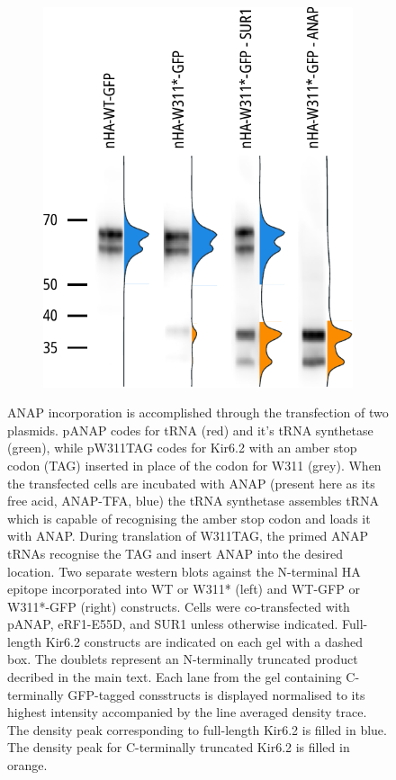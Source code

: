 \begin{figure}[h]
\begin{subfigure}[t]{0.45\textwidth}
		\includegraphics[width=\textwidth]{western_2.pdf}
	\end{subfigure}
	\caption[ANAP incorporation]{
	 ANAP incorporation is accomplished through the transfection of two plasmids.
	pANAP codes for tRNA (red) and it's tRNA synthetase (green), while pW311TAG codes for Kir6.2 with an amber stop codon (TAG) inserted in place of the codon for W311 (grey).
	When the transfected cells are incubated with ANAP (present here as its free acid, ANAP-TFA, blue) the tRNA synthetase assembles tRNA which is capable of recognising the amber stop codon and loads it with ANAP.
	During translation of W311TAG, the primed ANAP tRNAs recognise the TAG and insert ANAP into the desired location.
	 Two separate western blots against the N-terminal HA epitope incorporated into WT or W311* (left) and WT-GFP or W311*-GFP (right) constructs.
	Cells were co-transfected with pANAP, eRF1-E55D, and SUR1 unless otherwise indicated.
	Full-length Kir6.2 constructs are indicated on each gel with a dashed box.
	The doublets represent an N-terminally truncated product decribed in the main text.
	 Each lane from the gel containing C-terminally GFP-tagged consstructs is displayed normalised to its highest intensity accompanied by the line averaged density trace.
	The density peak corresponding to full-length Kir6.2 is filled in blue.
	The density peak for C-terminally truncated Kir6.2 is filled in orange.
	}\label{ch3fig:anap_incorporation}
\end{figure}

